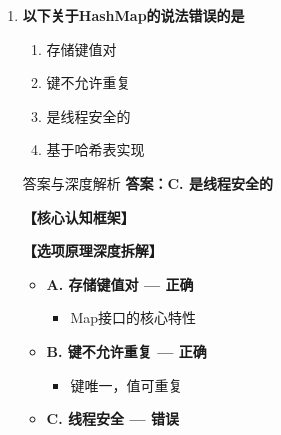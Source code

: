 \documentclass[12pt, a4paper]{ctexart}
\begin{document}
\begin{enumerate}[label=\textbf{\arabic*.}]
\begin{bluebox}{答案与深度解析}
\begin{itemize}[label={}, leftmargin=*, nosep]
\begin{itemize}[label={}, nosep]
		      

		      
					  \end{itemize}
					  \end{itemize}
\textbf{【应背诵知识点】}

		      Set实现类对比：
		      \begin{itemize}[label={}, nosep]
			      \item HashSet：无序，性能最好
			      \item LinkedHashSet：插入顺序
			      \item TreeSet：自然顺序/自定义排序
		      \end{itemize}
	      \end{bluebox}

	      \vspace{1em}

	\item \textbf{以下关于HashMap的说法错误的是}
	      \begin{enumerate}[label=\Alph*.]
		      \item 存储键值对
		      \item 键不允许重复
		      \item 是线程安全的
		      \item 基于哈希表实现
	      \end{enumerate}

	      \begin{bluebox}{答案与深度解析}
		      \textbf{答案：C. 是线程安全的}

		      \textbf{【核心认知框架】}

		      \textbf{【选项原理深度拆解】}
					  \begin{itemize}[label={}, leftmargin=*, nosep]

		      
		      \item \textbf{A. 存储键值对 — 正确}
					  \begin{itemize}[label={}, nosep]
		      
			      \item Map接口的核心特性
		      

					  \end{itemize}
		      \item \textbf{B. 键不允许重复 — 正确}
					  \begin{itemize}[label={}, nosep]
		      
			      \item 键唯一，值可重复
		      

					  \end{itemize}
		      \item \textbf{C. 线程安全 — 错误}
					  \begin{itemize}[label={}, nosep]
		      

\end{itemize}
\end{itemize}
\end{bluebox}
\end{enumerate}
\end{document}
